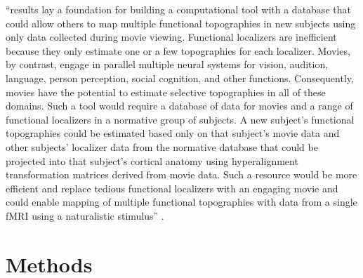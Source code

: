 %
``results lay a foundation for building a computational tool with a
database that could allow others to map multiple functional topographies in new
subjects using only data collected during movie viewing. Functional localizers
are inefficient because they only estimate one or a few topographies for each
localizer. Movies, by contrast, engage in parallel multiple neural systems for
vision, audition, language, person perception, social cognition, and other
functions. Consequently, movies have the potential to estimate selective
topographies in all of these domains. Such a tool would require a database of
data for movies and a range of functional localizers in a normative group of
subjects. A new subject's functional topographies could be estimated based only
on that subject's movie data and other subjects’ localizer data from the
normative database that could be projected into that subject’s cortical anatomy
using hyperalignment transformation matrices derived from movie data. Such a
resource would be more efficient and replace tedious functional localizers with
an engaging movie and could enable mapping of multiple functional topographies
with data from a single fMRI using a naturalistic stimulus''
\citep{jiahui2020predicting}.


\section{Methods}






